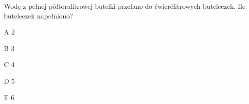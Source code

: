 \begin{tresc}
Wodę z pełnej półtoralitrowej butelki przelano do ćwierćlitrowych buteleczek. Ile buteleczek napełniono?
\end{tresc}
\begin{wariant}{A} 2 \end{wariant}
\begin{wariant}{B} 3 \end{wariant}
\begin{wariant}{C} 4 \end{wariant}
\begin{wariant}{D} 5 \end{wariant}
\begin{wariant}{E} 6 \end{wariant}
